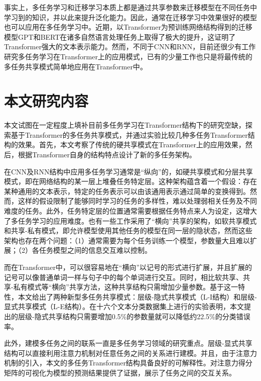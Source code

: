 事实上，多任务学习和迁移学习本质上都是通过共享参数来迁移模型在不同任务中学习到的知识，并以此来提升泛化能力。因此，通常在迁移学习中效果很好的模型也可以应用在多任务学习中。近期，以Transformer为预训练网络结构得到的迁移模型GPT\cite{radford2018improving}和BERT\cite{devlin2018bert}在诸多自然语言处理任务上取得了极大的提升，这证明了Transformer强大的文本表示能力。然而，不同于CNN和RNN，目前还很少有工作研究多任务学习在Transformer上的应用模式，已有的少量工作也只是将最传统的多任务共享模式简单地应用在Transformer中\cite{liu2019multi}。

\section{本文研究内容}

本文试图在一定程度上填补目前多任务学习在Transformer结构下的研究空缺，探索基于Transformer的多任务共享模式，并通过实验比较几种多任务Transformer结构的效果。首先，本文考察了传统的硬共享模式在Transformer上的应用效果，然后，根据Transformer自身的结构特点设计了新的多任务架构。

在CNN及RNN结构中应用多任务学习通常是“纵向”的，如硬共享模式和分层共享模式，即在网络结构的某一层上堆叠任务特定层\cite{DBLP:conf/acl/SogaardG16}\cite{DBLP:conf/ijcai/ZhengCQ18}。这种架构蕴含着一个假设：存在某种通用的文本表示，特定的任务表示可以由该通用表示通过简单的变换得到。然而，这样的假设限制了能够同时学习的任务的多样性，难以处理弱相关任务及不同难度的任务。此外，任务特定层的位置通常需要根据任务特点来人为设定，这增大了多任务学习的应用难度。也有一些工作采用了“横向”共享的架构，如软共享模式和共享-私有模式，即允许模型使用其他任务的模型在同一层的隐状态\cite{DBLP:conf/ijcai/LiuQH16}\cite{DBLP:conf/cvpr/MisraSGH16}\cite{1705.08142}，然而这些架构也存在两个问题：（1）通常需要为每个任务训练一个模型，参数量大且难以扩展；（2）各任务模型之间的信息交互难以控制。

而在Transformer中，可以很容易地在“横向”以记号的形式进行扩展，并且扩展的记号可以像普通单词一样与句子中的每个单词进行交互。同时，相比软共享、共享-私有模式等“横向”共享方法，这种共享结构只需增加少量参数。基于这一特性，本文给出了两种新型多任务共享模式：层级-隐式共享模式（L-I结构）和层级-显式共享模式（L-E结构）。在十六个文本分类数据集上进行的实验表明，本文提出的层级-隐式共享结构只需要增加0.5\%的参数量就可以降低约22.5\%的分类错误率。

此外，建模多任务之间的联系一直是多任务学习领域的研究重点。层级-显式共享结构可以直接利用注意力机制对任意任务之间的关系进行建模。并且，由于注意力机制的引入，本文的多任务Transformer结构具备良好的可解释性。对注意力得分矩阵的可视化为模型的预测结果提供了证据，展示了任务之间的交互关系。

